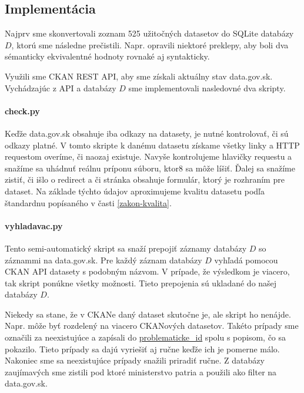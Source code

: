 \documentclass[12pt,a4paper]{article}
\begin{document}
\subsection{Implementácia}

Najprv sme skonvertovali zoznam 525 užitočných datasetov do SQLite databázy $D$, ktorú sme následne prečistili. Napr. opravili niektoré preklepy, aby boli dva sémanticky ekvivalentné hodnoty rovnaké aj syntakticky. 

Využili sme CKAN REST API, aby sme získali aktuálny stav data.gov.sk. Vychádzajúc z API a databázy $D$ sme implementovali nasledovné dva skripty. 

\paragraph{check.py}
Keďže data.gov.sk obsahuje iba odkazy na datasety, je nutné kontrolovať, či sú odkazy platné. V tomto skripte k danému datasetu získame všetky linky a HTTP requestom overíme, či naozaj existuje. Navyše kontrolujeme hlavičky requestu a snažíme sa uhádnuť reálnu príponu súboru, ktor8 sa môže líšiť. Ďalej sa snažíme zistiť, či išlo o redirect a či stránka obsahuje formulár, ktorý je rozhraním pre dataset. Na základe týchto údajov aproximujeme kvalitu datasetu podľa štandardnu popísaného v časti \ref{zakon-kvalita}. 

\paragraph{vyhladavac.py} 
Tento semi-automatický skript sa snaží prepojiť záznamy databázy $D$ so záznammi na data.gov.sk. Pre každý záznam databázy $D$ vyhľadá pomocou CKAN API datasety s podobným názvom. V prípade, že výsledkom je viacero, tak skript ponúkne všetky možnosti. Tieto prepojenia sú ukladané do našej databázy $D$. 

Niekedy sa stane, že v CKANe daný dataset skutočne je, ale skript ho nenájde. Napr. môže byť rozdelený na viacero CKANových datasetov. Takéto prípady sme označili za neexistujúce a zapísali do \href{https://github.com/koniiiik/opendata-sk-ias/blob/master/problematicke_id}{problematicke\_id} spolu s popisom, čo sa pokazilo. Tieto prípady sa dajú vyriešiť aj ručne keďže ich je pomerne málo. Nakoniec sme sa neexistujúce prípady snažili priradiť ručne. Z databázy zaujímavých sme zistili pod ktoré ministerstvo patria a použili ako filter na data.gov.sk.
\end{document}

